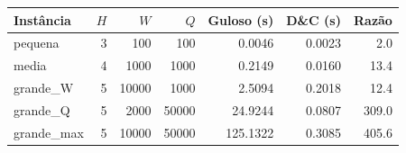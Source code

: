 \begin{tabular}{lrrrrrr}
\toprule
Instância & $H$ & $W$ & $Q$ & Guloso (s) & D\&C (s) & Razão \\
\midrule
pequena & 3 & 100 & 100 & 0.0046 & 0.0023 & 2.0 \\
media & 4 & 1000 & 1000 & 0.2149 & 0.0160 & 13.4 \\
grande\_W & 5 & 10000 & 1000 & 2.5094 & 0.2018 & 12.4 \\
grande\_Q & 5 & 2000 & 50000 & 24.9244 & 0.0807 & 309.0 \\
grande\_max & 5 & 10000 & 50000 & 125.1322 & 0.3085 & 405.6 \\
\bottomrule
\end{tabular}
